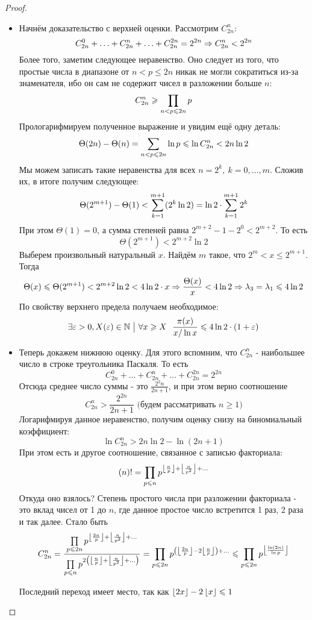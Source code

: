 \begin{proof}
	\begin{itemize}
		\item Начнём доказательство с верхней оценки. Рассмотрим $C_{2n}^n$:
		\[
			C_{2n}^0 + \ldots + C_{2n}^n + \ldots + C_{2n}^{2n} = 2^{2n} \Rightarrow C_{2n}^n < 2^{2n}
		\]
		Более того, заметим следующее неравенство. Оно следует из того, что простые числа в диапазоне от $n < p \le 2n$ никак не могли сократиться из-за знаменателя, ибо он сам не содержит чисел в разложении больше $n$:
		\[
			C_{2n}^n \geqslant \prod\limits_{n < p \leqslant 2n} p
		\]
		Прологарифмируем полученное выражение и увидим ещё одну деталь:
		\[
			\Theta(2n) - \Theta(n) = \sum\limits_{n < p \leqslant 2n} \ln p \leqslant \ln C_{2n}^n < 2n \ln 2
		\]
		Мы можем записать такие неравенства для всех $n = 2^k,\ k = 0, \ldots, m$. Сложив их, в итоге получим следующее:
		\[
			\Theta(2^{m + 1}) - \Theta(1) < \sum\limits_{k = 1}^{m + 1} (2^k \ln 2) = \ln 2 \cdot \sum\limits_{k = 1}^{m + 1} 2^k
		\]
		При этом $\Theta(1) = 0$, а сумма степеней равна $2^{m + 2} - 1 - 2^{0} < 2^{m + 2}$. То есть
		\[
			\Theta(2^{m + 1}) < 2^{m + 2} \ln 2
		\]
		Выберем произвольный натуральный $x$. Найдём $m$ такое, что $2^m < x \le 2^{m + 1}$. Тогда
		\[
			\Theta(x) \leqslant \Theta(2^{m + 1}) < 2^{m + 2} \ln 2 < 4\ln 2 \cdot x \Rightarrow \frac{\Theta(x)}{x} < 4 \ln 2 \Rightarrow \lambda_3 = \lambda_1 \leqslant 4 \ln 2
		\]
		По свойству верхнего предела получаем необходимое:
		\[
			\exists \varepsilon > 0, X(\varepsilon) \in \mathbb{N} \ \big|\  \forall x \geqslant X\ \ \frac{\pi(x)}{x / \ln x} \leqslant 4 \ln 2 \cdot (1 + \varepsilon)
		\]
		
		
		\item Теперь докажем нижнюю оценку. Для этого вспомним, что $C_{2n}^n$ - наибольшее число в строке треугольника Паскаля. То есть
		\[
			C_{2n}^0 + \ldots + C_{2n}^n + \ldots + C_{2n}^{2n} = 2^{2n}
		\]
		Отсюда среднее число суммы - это $\frac{2^2n}{2n + 1}$, и при этом верно соотношение
		\[
			C_{2n}^n > \frac{2^{2n}}{2n + 1} \text{ (будем рассматривать } n \ge 1 \text{)}
		\]
		Логарифмируя данное неравенство, получим оценку снизу на биномиальный коэффициент:
		\[
			\ln C_{2n}^n > 2n \ln 2 - \ln (2n + 1)
		\]
		При этом есть и другое соотношение, связанное с записью факториала:
		\[
			(n)! = \prod\limits_{p \leqslant n} p^{\left\lfloor \frac{n}{p} \right\rfloor + \left\lfloor \frac{n}{p^2} \right\rfloor + \ldots}
		\]
		Откуда оно взялось? Степень простого числа при разложении факториала - это вклад чисел от 1 до $n$, где данное простое число встретится 1 раз, 2 раза и так далее. Стало быть
		\[
			C_{2n}^n = \frac{\prod\limits_{p \leqslant 2n} p^{\left\lfloor \frac{2n}{p} \right\rfloor + \left\lfloor \frac{n}{p^2} \right\rfloor + \ldots}}{\prod\limits_{p \leqslant n} p^{2\left(\left\lfloor \frac{n}{p} \right\rfloor + \left\lfloor \frac{n}{p^2} \right\rfloor + \ldots\right)}} = \prod\limits_{p \leqslant 2n} p^{\left(\left\lfloor \frac{2n}{p} \right\rfloor - 2\left\lfloor \frac{n}{p} \right\rfloor\right) + \ldots} \leqslant \prod\limits_{p \leqslant 2n} p^{\left\lfloor \frac{\ln (2n)}{\ln p} \right\rfloor}
		\]
		\begin{proposition}
			Последний переход имеет место, так как $\left\lfloor 2x \right\rfloor - 2\left\lfloor x \right\rfloor \leqslant 1$
		\end{proposition}
	

\end{itemize}
\end{proof}
